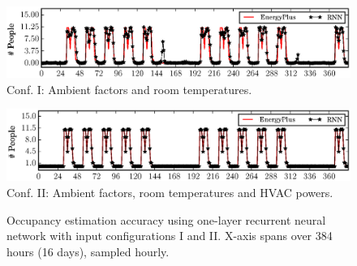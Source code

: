 \begin{figure}[h]
\begin{minipage}{\textwidth}
\centering\includegraphics[width=5in]{figs/results/1LRoomTOnlyDPFAugW3-4}
Conf. I: Ambient factors and room temperatures.
\end{minipage}
\hfill

\vspace{3ex}

\noindent\begin{minipage}{\textwidth}
\centering\includegraphics[width=5in]{figs/results/1LAmbHVACDPFAugW3-4}
Conf. II: Ambient factors, room temperatures and HVAC powers.
\end{minipage}
\hfill
    \caption{Occupancy estimation accuracy using one-layer recurrent neural
    network with input configurations I and II. X-axis spans over 384 hours (16 days), sampled hourly.}\label{fig:one-layer}
\end{figure}


